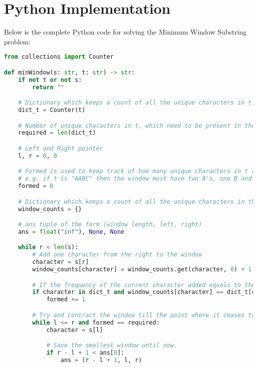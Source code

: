 
\section*{Python Implementation}
Below is the complete Python code for solving the Minimum Window Substring problem:

\begin{fullwidth}
\begin{lstlisting}[language=Python]
from collections import Counter

def minWindow(s: str, t: str) -> str:
    if not t or not s:
        return ""

    # Dictionary which keeps a count of all the unique characters in t.
    dict_t = Counter(t)

    # Number of unique characters in t, which need to be present in the desired window.
    required = len(dict_t)

    # Left and Right pointer
    l, r = 0, 0

    # Formed is used to keep track of how many unique characters in t are present in the current window in its desired frequency.
    # e.g. if t is "AABC" then the window must have two A's, one B and one C. Thus formed would be = 3 when all these conditions are met.
    formed = 0

    # Dictionary which keeps a count of all the unique characters in the current window.
    window_counts = {}

    # ans tuple of the form (window length, left, right)
    ans = float("inf"), None, None

    while r < len(s):
        # Add one character from the right to the window
        character = s[r]
        window_counts[character] = window_counts.get(character, 0) + 1

        # If the frequency of the current character added equals to the desired count in t then increment the formed count by 1.
        if character in dict_t and window_counts[character] == dict_t[character]:
            formed += 1

        # Try and contract the window till the point where it ceases to be 'desirable'.
        while l <= r and formed == required:
            character = s[l]

            # Save the smallest window until now.
            if r - l + 1 < ans[0]:
                ans = (r - l + 1, l, r)


\end{lstlisting}
\end{fullwidth}
